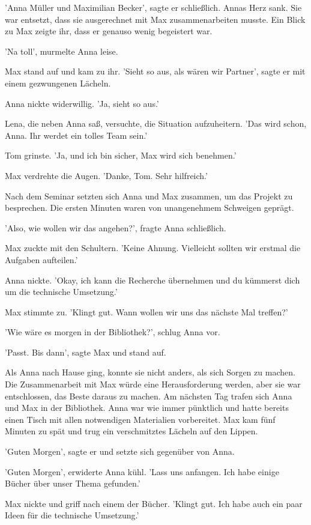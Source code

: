 \documentclass[12pt]{article}
\begin{document}
'Anna Müller und Maximilian Becker', sagte er schließlich. Annas Herz sank. Sie war entsetzt, dass sie ausgerechnet mit Max zusammenarbeiten musste. Ein Blick zu Max zeigte ihr, dass er genauso wenig begeistert war.

'Na toll', murmelte Anna leise.

Max stand auf und kam zu ihr. 'Sieht so aus, als wären wir Partner', sagte er mit einem gezwungenen Lächeln.

Anna nickte widerwillig. 'Ja, sieht so aus.'

Lena, die neben Anna saß, versuchte, die Situation aufzuheitern. 'Das wird schon, Anna. Ihr werdet ein tolles Team sein.'

Tom grinste. 'Ja, und ich bin sicher, Max wird sich benehmen.'

Max verdrehte die Augen. 'Danke, Tom. Sehr hilfreich.'

Nach dem Seminar setzten sich Anna und Max zusammen, um das Projekt zu besprechen. Die ersten Minuten waren von unangenehmem Schweigen geprägt.

'Also, wie wollen wir das angehen?', fragte Anna schließlich.

Max zuckte mit den Schultern. 'Keine Ahnung. Vielleicht sollten wir erstmal die Aufgaben aufteilen.'

Anna nickte. 'Okay, ich kann die Recherche übernehmen und du kümmerst dich um die technische Umsetzung.'

Max stimmte zu. 'Klingt gut. Wann wollen wir uns das nächste Mal treffen?'

'Wie wäre es morgen in der Bibliothek?', schlug Anna vor.

'Passt. Bis dann', sagte Max und stand auf.

Als Anna nach Hause ging, konnte sie nicht anders, als sich Sorgen zu machen. Die Zusammenarbeit mit Max würde eine Herausforderung werden, aber sie war entschlossen, das Beste daraus zu machen. Am nächsten Tag trafen sich Anna und Max in der Bibliothek. Anna war wie immer pünktlich und hatte bereits einen Tisch mit allen notwendigen Materialien vorbereitet. Max kam fünf Minuten zu spät und trug ein verschmitztes Lächeln auf den Lippen.

'Guten Morgen', sagte er und setzte sich gegenüber von Anna.

'Guten Morgen', erwiderte Anna kühl. 'Lass uns anfangen. Ich habe einige Bücher über unser Thema gefunden.'

Max nickte und griff nach einem der Bücher. 'Klingt gut. Ich habe auch ein paar Ideen für die technische Umsetzung.'
\end{document}
